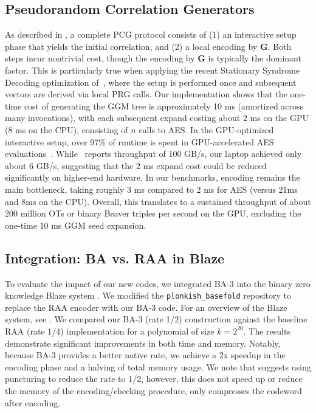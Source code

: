 \subsection{Pseudorandom Correlation Generators} \label{sec:eval_pcg}

As described in , a complete PCG protocol consists of (1) an interactive setup phase that yields the initial correlation, and (2) a local encoding by $\mathbf{G}$. Both steps incur nontrivial cost, though the encoding by $\mathbf{G}$ is typically the dominant factor. This is particularly true when applying the recent Stationary Syndrome Decoding optimization of~\cite{structuredlpn}, where the setup is performed once and subsequent vectors are derived via local PRG calls.
Our implementation shows that the one-time cost of generating the GGM tree is approximately 10 ms (amortized across many invocations), with each subsequent expand costing about 2 ms on the GPU (8 ms on the CPU), consisting of $n$ calls to AES. In the GPU-optimized interactive setup, over 97\% of runtime is spent in GPU-accelerated AES evaluations~\cite{aesgpu}. While~\cite{aesgpu} reports throughput of 100 GB/s, our laptop achieved only about 6 GB/s, suggesting that the 2 ms expand cost could be reduced significantly on higher-end hardware. In our benchmarks, encoding remains the main bottleneck, taking roughly 3 ms compared to 2 ms for AES (versus 21ms and 8ms on the CPU).
Overall, this translates to a sustained throughput of about 200 million OTs or binary Beaver triples per second on the GPU, excluding the one-time 10 ms GGM seed expansion.

\subsection{Integration: BA vs. RAA in Blaze}  \label{sec:eval_zk}

To evaluate the impact of our new codes, we integrated BA-3 into the binary zero knowledge  Blaze system \cite{blaze}.
We modified the \texttt{plonkish\_basefold} repository \cite{plonkish} to replace the RAA encoder with our BA-3 code.
For an overview of the Blaze system, see . We compared our BA-3 (rate 1/2) construction against the baseline RAA (rate 1/4) implementation for a polynomial of size $k=2^{20}$.
The results demonstrate significant improvements in both time and memory. Notably, because BA-3 provides a better native rate, we achieve a 2x speedup in the encoding phase and a halving of total memory usage. We note that \cite{blaze} suggests using puncturing to reduce the rate to 1/2, however, this does not speed up or reduce the memory of the encoding/checking procedure, only compresses the codeword after encoding.



